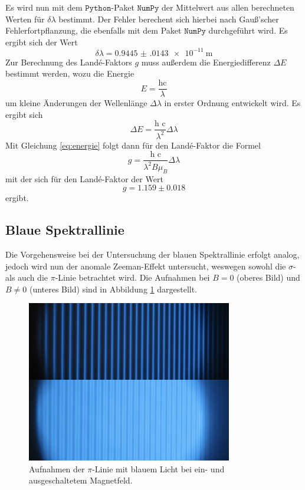 Es wird nun mit dem $\texttt{Python}$-Paket $\texttt{NumPy}$ der Mittelwert aus allen
berechneten Werten für $\delta \lambda$ bestimmt. Der Fehler berechent sich hierbei nach Gauß'scher Fehlerfortpflanzung,
die ebenfalls mit dem Paket $\texttt{NumPy}$ durchgeführt wird. Es ergibt sich der Wert
\begin{equation*}
    \delta \lambda = \SI{0.9445(0143)e-11}{\meter}
\end{equation*}
Zur Berechnung des Landé-Faktors $g$ muss außerdem die Energiedifferenz $\Delta E$ bestimmt werden, wozu die Energie
\begin{equation*}
    E = \frac{\text{hc}}{\lambda}
\end{equation*} 
um kleine Änderungen der Wellenlänge $\Delta \lambda$ in erster Ordnung entwickelt wird. Es ergibt sich
\begin{equation*}
    \Delta E = \frac{\text{h c}}{\lambda^2} \Delta \lambda
\end{equation*}
Mit Gleichung \eqref{eq:energie} folgt dann für den Landé-Faktor die Formel 
\begin{equation} 
    \label{eq:landee}
    g = \frac{\text{h c}}{\lambda^2 B \mu_B} \Delta \lambda
\end{equation}
mit der sich für den Landé-Faktor der Wert
\begin{equation*}
    g = 1.159\pm 0.018
\end{equation*}
ergibt.

\subsection{Blaue Spektrallinie}
Die Vorgehensweise bei der Untersuchung der blauen Spektrallinie erfolgt analog, jedoch wird nun der anomale Zeeman-Effekt
untersucht, weswegen sowohl die $\sigma$- als auch die $\pi$-Linie betrachtet wird. 
Die Aufnahmen bei $B = 0$ (oberes Bild) und $B \neq 0$ (unteres Bild) sind in Abbildung \ref{fig:afig3} dargestellt.
\FloatBarrier
\begin{figure}
    \centering
    \includegraphics[width=0.8\textwidth]{pi.jpg}
    \caption{Aufnahmen der $\pi$-Linie mit blauem Licht bei ein- und ausgeschaltetem Magnetfeld.}
    \label{fig:afig3}
\end{figure}
\FloatBarrier
